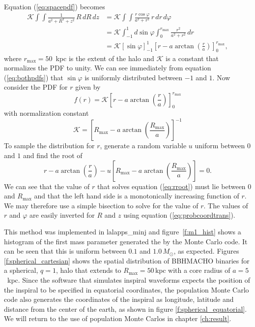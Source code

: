 Equation (\ref{eq:spacepdf}) becomes
\begin{equation}
\begin{split}
\mathcal{K} \int\int \frac{1}{a^2 + R^2 + z^2}\,R\, dR\, dz 
&= \mathcal{K} \int\int \frac{r\cos\varphi}{a^2+r^2}\,r\, dr \, d\varphi \\
&= \mathcal{K} \int_{-1}^{1} d\sin\varphi \int_0^{r_{\mathrm{max}}} \frac{r^2}{a^2+r^2}\, dr \\
&= \mathcal{K} \left[\sin\varphi\right]_{-1}^1 \left[r -
a\arctan\left(\frac{r}{a}\right)\right]_0^{r_{\mathrm{max}}},
\end{split}
\label{eq:bothpdfs}
\end{equation}
where $r_\mathrm{max} = 50$~kpc is the extent of the halo and $\mathcal{K}$ is
a constant that normalizes the PDF to unity. We can see immediately from
equation (\ref{eq:bothpdfs}) that $\sin\varphi$ is uniformly
distributed between $-1$ and $1$. Now consider the PDF for $r$ given by
\begin{equation}
f(r) = \mathcal{K} \left[r - a\arctan\left(\frac{r}{a}\right)\right]_0^{r_{\mathrm{max}}}
\end{equation}
with normalization constant
\begin{equation}
\mathcal{K} = 
\left[R_\mathrm{max} -
a\arctan\left(\frac{R_\mathrm{max}}{a}\right)\right]^{-1}
\end{equation}
To sample the distribution for $r$, generate a random variable $u$
uniform between $0$ and $1$ and find the root of
\begin{equation}
r - a\arctan\left(\frac{r}{a}\right) - u \left[R_\mathrm{max} -
a\arctan\left(\frac{R_\mathrm{max}}{a}\right)\right] = 0.
\label{eq:rroot}
\end{equation}
We can see that the value of $r$ that solves equation (\ref{eq:rroot}) must
lie between $0$ and $R_\mathrm{max}$ and that the left hand side is a
monotonically increasing function of $r$. We may therefore use a simple 
bisection to solve for the value of $r$. The values of $r$
and $\varphi$ are easily inverted for $R$ and $z$ using equation
(\ref{eq:probcoordtrans}). 

This method was implemented in lalapps\_minj and figure~\ref{f:m1_hist} shows
a histogram of the first mass parameter generated the by the Monte Carlo code.
It can be seen that this is uniform between $0.1$ and $1.0\,M_\odot$, as
expected. Figures \ref{f:spherical_cartesian} shows the spatial distribution
of BBHMACHO binaries for a spherical, $q=1$, halo that extends to
$R_\mathrm{max} = 50\,\mathrm{kpc}$ with a core radius of $a = 5$~kpc.  Since
the software that simulates inspiral waveforms expects the position of the
inspiral to be specified in equatorial coordinates, the population Monte Carlo
code also generates the coordinates of the inspiral as longitude, latitude and
distance from the center of the earth, as shown in figure
\ref{f:spherical_equatorial}.  We will return to the use of population Monte
Carlos in chapter \ref{ch:result}.


